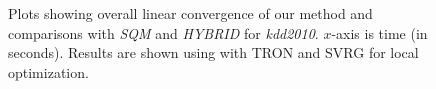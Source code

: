 \begin{figure}[t]
\centering
{}
\caption{Plots showing overall linear convergence of our method and comparisons with {\it{SQM}} and {\it{HYBRID}} for {\it{kdd2010}}. $x$-axis is time (in seconds). Results are shown using with TRON and SVRG for local optimization.}
\label{timepass}
\end{figure}


